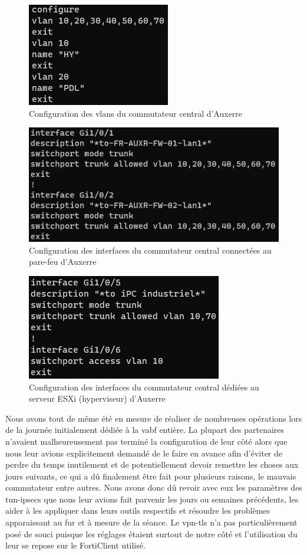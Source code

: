 \documentclass[12pt, oneside, a4paper, titlepage]{report}
\begin{document}
\begin{figure}[h!]
    \centering
    \includegraphics[width = 0.4\linewidth]{img/sw-auxr/vlans.png}
    \caption{Configuration des \glspl{vlan} du commutateur central d'Auxerre}%
    \label{fig:sw-auxr/vlans}
\end{figure}

\begin{figure}[h!]
    \centering
    \includegraphics[width = 0.7\linewidth]{img/sw-auxr/fw-ifs.png}
    \caption{%
        Configuration des interfaces du commutateur central connectées au
        pare-feu d'Auxerre%
    }%
    \label{fig:sw-auxr/fw-ifs}
\end{figure}

\begin{figure}[h!]
    \centering
    \includegraphics[width = 0.5\linewidth]{img/sw-auxr/esxi-ifs.png}
    \caption{%
        Configuration des interfaces du commutateur central dédiées au serveur
        ESXi (hyperviseur) d'Auxerre%
    }%
    \label{fig:sw-auxr/esxi-ifs}
\end{figure}
\FloatBarrier{}

Nous avons tout de même été en mesure de réaliser de nombreuses opérations lors
de la journée initialement dédiée à la \gls{vabf} entière. La plupart des
partenaires n'avaient malheureusement pas terminé la configuration de leur côté
alors que nous leur avions explicitement demandé de le faire en avance afin
d'éviter de perdre du temps inutilement et de potentiellement devoir remettre
les choses aux jours suivants, ce qui a dû finalement être fait pour plusieurs
raisons, le mauvais commutateur entre autres. Nous avons donc dû revoir avec eux
les paramètres des \glspl{tun-ipsec} que nous leur avions fait parvenir les
jours ou semaines précédents, les aider à les appliquer dans leurs outils
respectifs et résoudre les problèmes apparaissant au fur et à mesure de la
séance. Le \gls{vpn-tls} n'a pas particulièrement posé de souci puisque les
réglages étaient surtout de notre côté et l'utilisation du leur se repose sur le
FortiClient utilisé.
\end{document}
